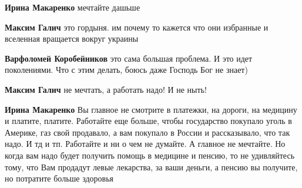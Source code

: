 \begin{itemize}
\begin{itemize}
 
\textbf{Ирина Макаренко} мечтайте дашьше

 
\textbf{Максим Галич} это гордыня. им почему то кажется что они избранные и вселенная вращается вокруг украины

 
\textbf{Варфоломей Коробейников} это сама большая проблема. И это идет поколениями. Что с этим делать, боюсь даже Господь Бог не знает)

 
\textbf{Максим Галич} не мечтать, а работать надо! И не ныть!

 
\textbf{Ирина Макаренко} Вы главное не смотрите в платежки, на дороги, на
медицину и платите, платите. Работайте еще больше, чтобы государство покупало
уголь в Америке, газ свой продавало, а вам покупало в России и рассказывало,
что так надо. И тд и тп. Работайте и ни о чем не думайте. А главное не
мечтайте. Но когда вам надо будет получить помощь в медицине и пенсию, то не
удивляйтесь тому, что Вам продадут левые лекарства, за ваши деньги, а пенсию вы
получите, но потратите больше здоровья

\end{itemize}


\end{itemize}
